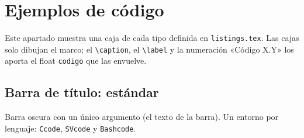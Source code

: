 %
%
\section{Ejemplos de código}
\label{sec:ej-codigo}

Este apartado muestra una caja de cada tipo definida en \texttt{listings.tex}. Las cajas solo dibujan el marco; el \texttt{\textbackslash caption}, el \texttt{\textbackslash label} y la numeración «Código X.Y» los aporta el float \texttt{codigo} que las envuelve.

\subsection{Barra de título: estándar}
\label{subsec:ej-code-estandar}

Barra oscura con un único argumento (el texto de la barra). Un entorno por lenguaje: \texttt{Ccode}, \texttt{SVcode} y \texttt{Bashcode}.

